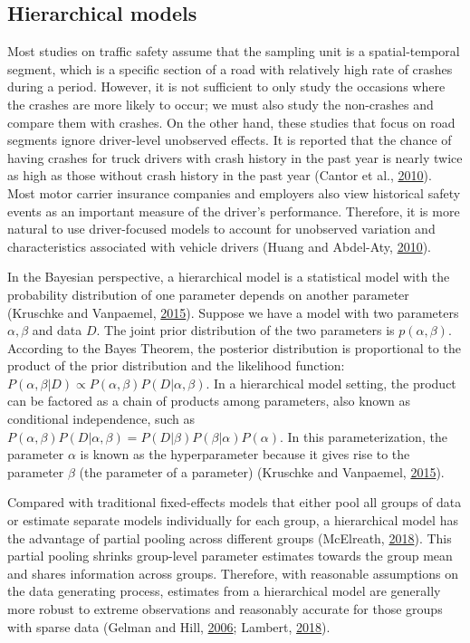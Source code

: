 \documentclass[12pt]{book}
\numberwithin{equation}{chapter}
\begin{document}
\hypertarget{hierarchical-models}{%
\subsection{Hierarchical models}\label{hierarchical-models}}

Most studies on traffic safety assume that the sampling unit is a spatial-temporal segment, which is a specific section of a road with relatively high rate of crashes during a period. However, it is not sufficient to only study the occasions where the crashes are more likely to occur; we must also study the non-crashes and compare them with crashes. On the other hand, these studies that focus on road segments ignore driver-level unobserved effects. It is reported that the chance of having crashes for truck drivers with crash history in the past year is nearly twice as high as those without crash history in the past year (Cantor et al., \protect\hyperlink{ref-cantor2010driver}{2010}). Most motor carrier insurance companies and employers also view historical safety events as an important measure of the driver's performance. Therefore, it is more natural to use driver-focused models to account for unobserved variation and characteristics associated with vehicle drivers (Huang and Abdel-Aty, \protect\hyperlink{ref-huang2010multilevel}{2010}).

In the Bayesian perspective, a hierarchical model is a statistical model with the probability distribution of one parameter depends on another parameter (Kruschke and Vanpaemel, \protect\hyperlink{ref-kruschke2015bayesian}{2015}). Suppose we have a model with two parameters \(\alpha, \beta\) and data \(D\). The joint prior distribution of the two parameters is \(p(\alpha, \beta)\). According to the Bayes Theorem, the posterior distribution is proportional to the product of the prior distribution and the likelihood function: \(P(\alpha, \beta|D) \propto P(\alpha, \beta)P(D|\alpha,\beta)\). In a hierarchical model setting, the product can be factored as a chain of products among parameters, also known as conditional independence, such as \(P(\alpha, \beta)P(D|\alpha,\beta) = P(D|\beta)P(\beta|\alpha)P(\alpha)\). In this parameterization, the parameter \(\alpha\) is known as the hyperparameter because it gives rise to the parameter \(\beta\) (the parameter of a parameter) (Kruschke and Vanpaemel, \protect\hyperlink{ref-kruschke2015bayesian}{2015}).

Compared with traditional fixed-effects models that either pool all groups of data or estimate separate models individually for each group, a hierarchical model has the advantage of partial pooling across different groups (McElreath, \protect\hyperlink{ref-mcelreath2018statistical}{2018}). This partial pooling shrinks group-level parameter estimates towards the group mean and shares information across groups. Therefore, with reasonable assumptions on the data generating process, estimates from a hierarchical model are generally more robust to extreme observations and reasonably accurate for those groups with sparse data (Gelman and Hill, \protect\hyperlink{ref-gelman2006data}{2006}; Lambert, \protect\hyperlink{ref-lambert2018student}{2018}).
\end{document}
